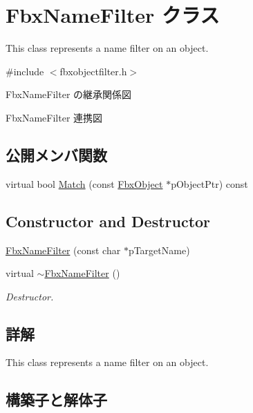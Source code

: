 \hypertarget{class_fbx_name_filter}{}\section{Fbx\+Name\+Filter クラス}
\label{class_fbx_name_filter}


This class represents a name filter on an object.  




{\ttfamily \#include $<$fbxobjectfilter.\+h$>$}



Fbx\+Name\+Filter の継承関係図


Fbx\+Name\+Filter 連携図
\subsection*{公開メンバ関数}
\begin{DoxyCompactItemize}
\item 
virtual bool \hyperlink{class_fbx_name_filter_a2767c75f626baed7800308f937302743}{Match} (const \hyperlink{class_fbx_object}{Fbx\+Object} $\ast$p\+Object\+Ptr) const
\end{DoxyCompactItemize}
\subsection*{Constructor and Destructor}
\begin{DoxyCompactItemize}
\item 
\hyperlink{class_fbx_name_filter_aa617f8a9e025839e93cf0fda0ec6cda4}{Fbx\+Name\+Filter} (const char $\ast$p\+Target\+Name)
\item 
virtual \hyperlink{class_fbx_name_filter_a44742170200731e2943525ccad88c48e}{$\sim$\+Fbx\+Name\+Filter} ()
\begin{DoxyCompactList}\small\item\em Destructor. \end{DoxyCompactList}\end{DoxyCompactItemize}


\subsection{詳解}
This class represents a name filter on an object. 

\subsection{構築子と解体子}
\mbox{\label{class_fbx_name_filter_aa617f8a9e025839e93cf0fda0ec6cda4}} 

